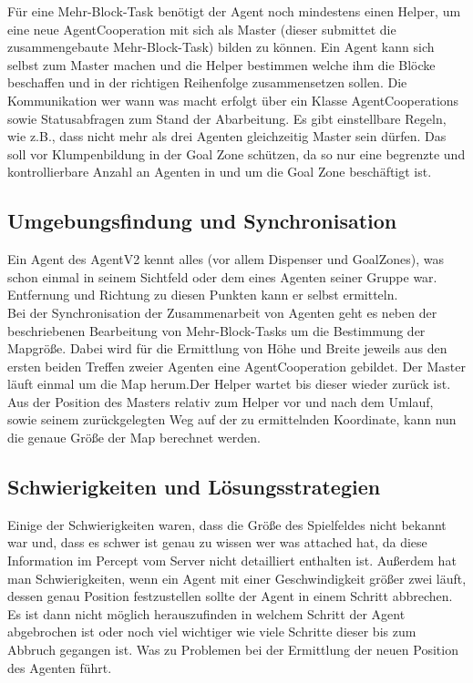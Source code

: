 \documentclass[runningheads]{llncs}
\begin{document}
Für eine Mehr-Block-Task benötigt der Agent noch mindestens einen Helper, um eine neue AgentCooperation mit sich als Master (dieser submittet die zusammengebaute Mehr-Block-Task) bilden zu können. 
Ein Agent kann sich selbst zum Master machen und die Helper bestimmen welche ihm die Blöcke beschaffen und in der richtigen Reihenfolge zusammensetzen sollen.  
Die Kommunikation wer wann was macht erfolgt über ein Klasse AgentCooperations sowie Statusabfragen zum Stand der Abarbeitung. Es gibt einstellbare Regeln, wie z.B., dass nicht mehr als drei Agenten gleichzeitig Master sein dürfen. Das soll vor Klumpenbildung in der Goal Zone schützen, da so nur eine begrenzte und kontrollierbare Anzahl an Agenten in und um die Goal Zone beschäftigt ist.\\

\subsection{Umgebungsfindung und Synchronisation}
Ein Agent des AgentV2 kennt alles (vor allem Dispenser und GoalZones), was schon einmal in seinem Sichtfeld oder dem eines Agenten seiner Gruppe war. Entfernung und Richtung zu diesen Punkten kann er selbst ermitteln.\\

Bei der Synchronisation der Zusammenarbeit von Agenten  geht es neben der beschriebenen Bearbeitung von Mehr-Block-Tasks um die Bestimmung der Mapgröße. Dabei wird für die Ermittlung von Höhe und Breite jeweils aus den ersten beiden Treffen zweier Agenten eine AgentCooperation gebildet. Der Master läuft einmal um die Map herum.Der Helper wartet bis dieser wieder zurück ist. Aus der Position des Masters relativ zum Helper vor und nach dem Umlauf, sowie seinem zurückgelegten Weg auf der zu ermittelnden Koordinate, kann nun die genaue Größe der Map berechnet werden. 

\subsection{Schwierigkeiten und Lösungsstrategien}
Einige der Schwierigkeiten waren, dass die Größe des Spielfeldes nicht bekannt war und, dass es schwer ist genau zu wissen wer was attached hat, da diese Information im Percept vom Server nicht detailliert enthalten ist. Außerdem hat man Schwierigkeiten, wenn ein Agent mit einer Geschwindigkeit größer zwei läuft, dessen genau Position festzustellen sollte der Agent in einem Schritt abbrechen. Es ist dann nicht möglich herauszufinden in welchem Schritt der Agent abgebrochen ist oder noch viel wichtiger wie viele Schritte dieser bis zum Abbruch gegangen ist. Was zu Problemen bei der Ermittlung der neuen Position des Agenten führt.\\
\end{document}
